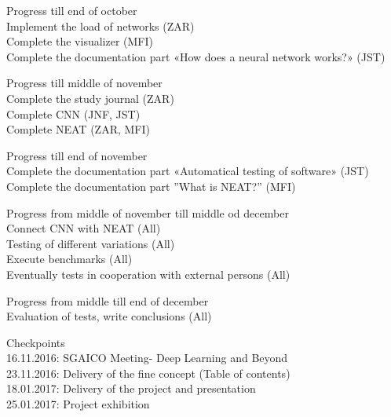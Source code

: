 Progress till end of october\\
Implement the load of networks (ZAR)\\
Complete the visualizer (MFI)\\ 
Complete the documentation part «How does a neural network works?» (JST)

Progress till middle of november\\
Complete the study journal (ZAR)\\
Complete CNN (JNF, JST)\\
Complete NEAT (ZAR, MFI)

Progress till end of november\\
Complete the documentation part «Automatical testing of software» (JST)\\ Complete the documentation part ”What is NEAT?” (MFI)

Progress from middle of november till middle od december\\
Connect CNN with NEAT (All)\\
Testing of different variations (All)\\
Execute benchmarks (All)\\
Eventually tests in cooperation with external persons (All)

Progress from middle till end of december\\
Evaluation of tests, write conclusions (All)

Checkpoints\\
16.11.2016: SGAICO Meeting- Deep Learning and Beyond\\
23.11.2016: Delivery of the fine concept (Table of contents)\\
18.01.2017: Delivery of the project and presentation\\
25.01.2017: Project exhibition\\
